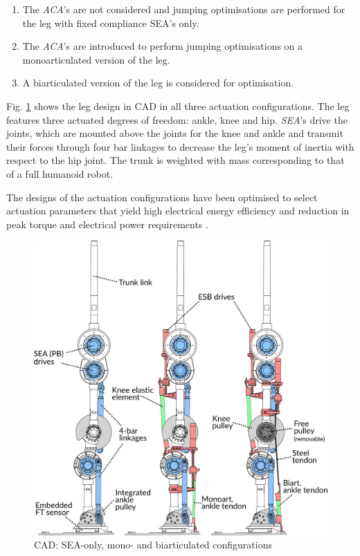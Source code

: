 \documentclass[letterpaper, 10 pt, conference]{ieeeconf}  %
\begin{document}
\begin{enumerate}
	\item The \textit{ACA}'s are not considered and jumping optimisations are performed for the leg with fixed compliance SEA's only.
	\item The \textit{ACA}'s are introduced to perform jumping optimisations on a monoarticulated version of the leg. 
	\item A biarticulated version of the leg is considered for optimisation.
\end{enumerate}

Fig. \ref{fig:configurations} shows the leg design in CAD in all three actuation configurations. The leg features three actuated degrees of freedom: ankle, knee and hip. \textit{SEA}'s drive the joints, which are mounted above the joints for the knee and ankle and transmit their forces through four bar linkages to decrease the leg’s moment of inertia with respect to the hip joint. The trunk is weighted with mass corresponding to that of a full humanoid robot.

The designs of the actuation configurations have been optimised to select actuation parameters that yield high electrical energy efficiency and reduction in peak torque and electrical power requirements \cite{roozing2016design}.

\begin{figure}[ht]
	\centering
	\includegraphics[width=0.98\linewidth]{cad}
	\caption{CAD: SEA-only, mono- and biarticulated configurations}
	\label{fig:configurations}
\end{figure}
\end{document}
